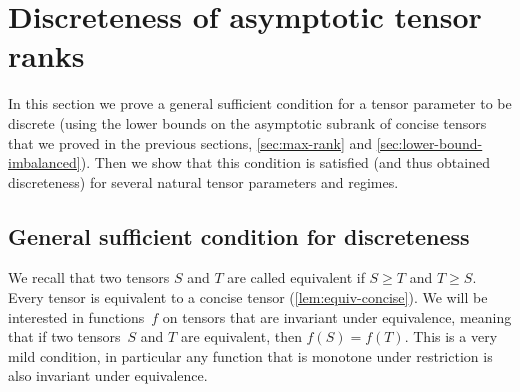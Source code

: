 \documentclass{daj}
\begin{document}
%
%
    
%

%

%
%

%
%
    
%
%
    
%
    
%
%
%
%
%
%
%
%
%
%
%
%

%
%
%
%

%
%
%

%
    
%
%
%
%
%
%
%
%
%
%
%
%
%
%

%
%
%
%

%
%
    
%
    
%
    
%

%
%

%
%
%
%
    
%
    
%
%




\section{Discreteness of asymptotic tensor ranks}
\label{sec:discreteness}
%
%

In this section we prove a general sufficient condition for a tensor parameter to be discrete (using the lower bounds on the asymptotic subrank of concise tensors that we proved in the previous sections, \autoref{sec:max-rank} %
and \autoref{sec:lower-bound-imbalanced}). Then we show that this condition is satisfied (and thus obtained discreteness) for several natural tensor parameters and regimes.

\subsection{General sufficient condition for discreteness}

We recall that two tensors $S$ and $T$ are called equivalent if $S \geq T$ and $T \geq S$. Every tensor is equivalent to a concise tensor (\autoref{lem:equiv-concise}). We will be interested in functions~$f$ on tensors that are invariant under equivalence, meaning that if two tensors~$S$ and $T$ are equivalent, then $f(S) = f(T)$. This is a very mild condition, in particular any function that is monotone under restriction is also invariant under equivalence.
\end{document}
